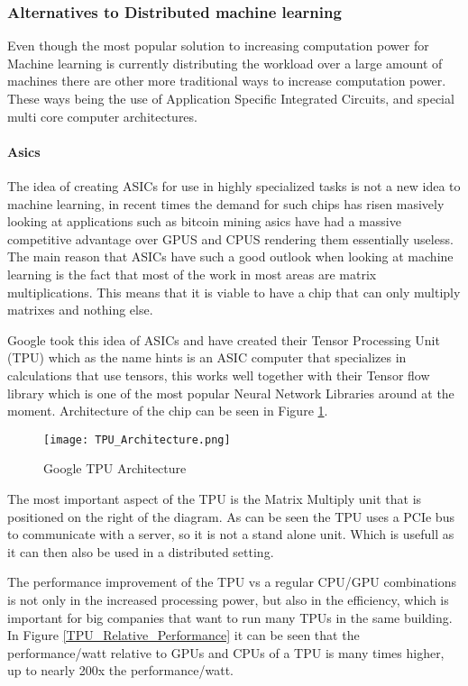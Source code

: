 
\subsubsection{Alternatives to Distributed machine learning}
Even though the most popular solution to increasing computation power for Machine
learning is currently distributing the workload over a large amount of machines
there are other more traditional ways to increase computation power. These ways
being the use of Application Specific Integrated Circuits, and special multi core
computer architectures.

\paragraph{Asics}
The idea of creating ASICs for use in highly specialized tasks is not a new idea
to machine learning, in recent times the demand for such chips has risen masively\cite{Metz18}
looking at applications such as bitcoin mining asics have had a massive competitive
advantage over GPUS and CPUS rendering them essentially useless. The main reason
that ASICs have such a good outlook when looking at machine
learning is the fact that most of the work in most areas are matrix multiplications.
This means that it is viable to have a chip that can only multiply matrixes and nothing
else.

Google took this idea of ASICs and have created their Tensor Processing Unit (TPU)\cite{Sato17}
which as the name hints is an ASIC computer that specializes in calculations that
use tensors, this works well together with their Tensor flow library which is one
of the most popular Neural Network Libraries around at the moment. Architecture of
the chip can be seen in Figure \ref{TPU_Architecture}.

\begin{figure}
  \texttt{[image: TPU\_Architecture.png]}
  \caption{Google TPU Architecture\cite{Joup17}}
  \label{TPU_Architecture}
\end{figure}

The most important aspect of the TPU is the Matrix Multiply unit that is positioned
on the right of the diagram. As can be seen the TPU uses a PCIe bus to communicate
with a server, so it is not a stand alone unit. Which is usefull as it can then also
be used in a distributed setting.

The performance improvement of the TPU vs a regular CPU/GPU combinations is not only
in the increased processing power, but also in the efficiency, which is important
for big companies that want to run many TPUs in the same building. In Figure \ref{TPU_Relative_Performance}
it can be seen that the performance/watt relative to GPUs and CPUs of a TPU is many times higher,
up to nearly 200x the performance/watt.

